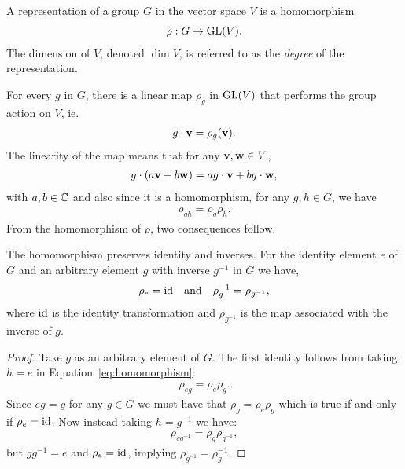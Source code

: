 \begin{definition}[Representation]\cite{Serre}
	A representation of a group $G$ in the vector space $V$ is a homomorphism
	\begin{align}\label{eq:DefRepr}
		\rho: G \rightarrow \text{GL}(V).
	\end{align}
	The dimension of $V$, denoted $\dim V$, is referred to as the \textit{degree} of the representation.
\end{definition}
For every $g$ in $G$, there is a linear map $\rho_g$ in $\text{GL}(V)$ that performs the group action on $V$, ie. 
\begin{align*}
	g \cdot \mathbf{v} = \rho_g (\mathbf{v}).
\end{align*}
The linearity of the map means that for any $\mathbf{v}, \mathbf{w} \in V$,
\begin{align*}%
	g \cdot (a\vvec + b\wvec) = ag\cdot\vvec + bg\cdot\wvec,
\end{align*} 
with $a,b \in \mathbb{C}$ and also since it is a homomorphism, for any $g,h \in G$, we have
\begin{align}\label{eq:homomorphism}
	\rho_{gh} = \rho_g \rho_h.
\end{align}
From the homomorphism of $\rho$, two consequences follow.
\begin{proposition}\label{prop:homoidinv}
	The homomorphism preserves identity and inverses. For the identity element $e$ of $G$ and an arbitrary element $g$ with inverse $g^{-1}$ in $G$ we have,
	\begin{align}\label{eq:rhoIdAndInv}
		\rho_e = \text{id} \quad \text{and} \quad \rho_g^{-1} = \rho_{g^{-1}},
	\end{align}
	where $\text{id}$ is the identity transformation and $\rho_{g^{-1}}$ is the map associated with the inverse of $g$.
\end{proposition}
\begin{proof}
	Take $g$ as an arbitrary element of $G$. The first identity follows from taking $h=e$ in Equation~\ref{eq:homomorphism}:
	\begin{align*}
		\rho_{eg} = \rho_e \rho_g.
	\end{align*}
	Since $eg=g$ for any $g\in G$ we must have that $\rho_g = \rho_e\rho_g$ which is true if and only if $\rho_e = \text{id}$. Now instead taking $h=g^{-1}$ we have:
	\begin{align*}
		\rho_{gg^{-1}} = \rho_g \rho_{g^{-1}},
	\end{align*}
	but $gg^{-1} = e$ and $\rho_e = \text{id}$, implying $\rho_{g^{-1}} = \rho_g^{-1}$.
\end{proof}

